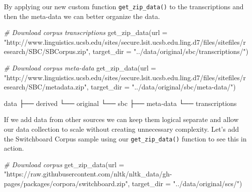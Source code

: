 \documentclass[
]{article}
\newenvironment{Shaded}{\begin{snugshade}}{\end{snugshade}}
\newcommand{\AttributeTok}[1]{\textcolor[rgb]{0.77,0.63,0.00}{#1}}
\newcommand{\CommentTok}[1]{\textcolor[rgb]{0.56,0.35,0.01}{\textit{#1}}}
\newcommand{\ExtensionTok}[1]{#1}
\newcommand{\FunctionTok}[1]{\textcolor[rgb]{0.00,0.00,0.00}{#1}}
\newcommand{\NormalTok}[1]{#1}
\newcommand{\StringTok}[1]{\textcolor[rgb]{0.31,0.60,0.02}{#1}}
\begin{document}
By applying our new custom function \texttt{get\_zip\_data()} to the transcriptions and then the meta-data we can better organize the data.

\begin{Shaded}
\begin{Highlighting}[]
\CommentTok{\# Download corpus transcriptions}
\FunctionTok{get\_zip\_data}\NormalTok{(}\AttributeTok{url =} \StringTok{"http://www.linguistics.ucsb.edu/sites/secure.lsit.ucsb.edu.ling.d7/files/sitefiles/research/SBC/SBCorpus.zip"}\NormalTok{,}
    \AttributeTok{target\_dir =} \StringTok{"../data/original/sbc/transcriptions/"}\NormalTok{)}

\CommentTok{\# Download corpus meta{-}data}
\FunctionTok{get\_zip\_data}\NormalTok{(}\AttributeTok{url =} \StringTok{"http://www.linguistics.ucsb.edu/sites/secure.lsit.ucsb.edu.ling.d7/files/sitefiles/research/SBC/metadata.zip"}\NormalTok{,}
    \AttributeTok{target\_dir =} \StringTok{"../data/original/sbc/meta{-}data/"}\NormalTok{)}
\end{Highlighting}
\end{Shaded}

\begin{Shaded}
\begin{Highlighting}[]
\ExtensionTok{data}
\ExtensionTok{├──}\NormalTok{ derived}
\ExtensionTok{└──}\NormalTok{ original}
    \ExtensionTok{└──}\NormalTok{ sbc}
        \ExtensionTok{├──}\NormalTok{ meta{-}data}
        \ExtensionTok{└──}\NormalTok{ transcriptions}
\end{Highlighting}
\end{Shaded}

If we add data from other sources we can keep them logical separate and allow our data collection to scale without creating unnecessary complexity. Let's add the Switchboard Corpus sample using our \texttt{get\_zip\_data()} function to see this in action.

\begin{Shaded}
\begin{Highlighting}[]
\CommentTok{\# Download corpus}
\FunctionTok{get\_zip\_data}\NormalTok{(}\AttributeTok{url =} \StringTok{"https://raw.githubusercontent.com/nltk/nltk\_data/gh{-}pages/packages/corpora/switchboard.zip"}\NormalTok{,}
    \AttributeTok{target\_dir =} \StringTok{"../data/original/scs/"}\NormalTok{)}
\end{Highlighting}
\end{Shaded}
\end{document}

